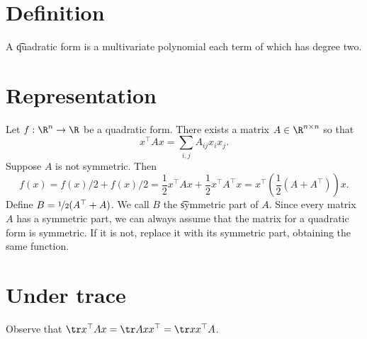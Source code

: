 
\section*{Definition}

A \t{quadratic form} is a multivariate polynomial each term of which has degree two.

\section*{Representation}

Let $f: \R ^n \to \R $ be a quadratic form.
There exists a matrix $A \in \R ^{n \times  n}$ so that
  \[
x^\top  A x = \sum_{i,j} A_{ij}x_{i}x_{j}.
  \]
Suppose $A$ is not symmetric. Then
  \[
f(x) = f(x)/2 + f(x)/2 = \frac{1}{2}x^\top Ax + \frac{1}{2}x^\top A^\top x = x^\top (\frac{1}{2}(A + A^\top ))x.
  \]
Define $B = \nicefrac{1}{2}(A^\top  + A)$.
We call $B$ the \t{symmetric part} of $A$.
Since every matrix $A$ has a symmetric part, we can always assume that the matrix for a quadratic form is symmetric.
If it is not, replace it with its symmetric part, obtaining the same function.

\section*{Under trace}

Observe that $\tr x^\top  A x = \tr A x x^\top  = \tr xx^\top A$.

\blankpage